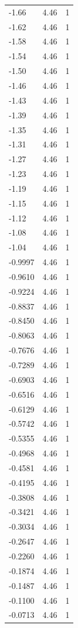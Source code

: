 \begin{longtable}{lrr}
  -1.66 & 4.46 & 1 \\
  -1.62 & 4.46 & 1 \\
  -1.58 & 4.46 & 1 \\
  -1.54 & 4.46 & 1 \\
  -1.50 & 4.46 & 1 \\
  -1.46 & 4.46 & 1 \\
  -1.43 & 4.46 & 1 \\
  -1.39 & 4.46 & 1 \\
  -1.35 & 4.46 & 1 \\
  -1.31 & 4.46 & 1 \\
  -1.27 & 4.46 & 1 \\
  -1.23 & 4.46 & 1 \\
  -1.19 & 4.46 & 1 \\
  -1.15 & 4.46 & 1 \\
  -1.12 & 4.46 & 1 \\
  -1.08 & 4.46 & 1 \\
  -1.04 & 4.46 & 1 \\
  -0.9997 & 4.46 & 1 \\
  -0.9610 & 4.46 & 1 \\
  -0.9224 & 4.46 & 1 \\
  -0.8837 & 4.46 & 1 \\
  -0.8450 & 4.46 & 1 \\
  -0.8063 & 4.46 & 1 \\
  -0.7676 & 4.46 & 1 \\
  -0.7289 & 4.46 & 1 \\
  -0.6903 & 4.46 & 1 \\
  -0.6516 & 4.46 & 1 \\
  -0.6129 & 4.46 & 1 \\
  -0.5742 & 4.46 & 1 \\
  -0.5355 & 4.46 & 1 \\
  -0.4968 & 4.46 & 1 \\
  -0.4581 & 4.46 & 1 \\
  -0.4195 & 4.46 & 1 \\
  -0.3808 & 4.46 & 1 \\
  -0.3421 & 4.46 & 1 \\
  -0.3034 & 4.46 & 1 \\
  -0.2647 & 4.46 & 1 \\
  -0.2260 & 4.46 & 1 \\
  -0.1874 & 4.46 & 1 \\
  -0.1487 & 4.46 & 1 \\
  -0.1100 & 4.46 & 1 \\
  -0.0713 & 4.46 & 1 \\

\end{longtable}
